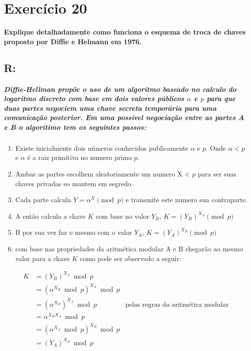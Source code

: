 \documentclass[10pt,a4paper]{report}
\begin{document}
\section*{Exercício 20}
\paragraph{Explique detalhadamente como funciona o esquema de troca de chaves proposto por Diffie e Helmann em 1976.}
\subsection*{R:}
\subparagraph{Diffie-Hellman propõe o uso de um algoritmo baseado no calculo do logaritmo discreto com base em dois valores públicos $\alpha$ e $p$ para que duas partes negociem uma chave secreta temporária para uma comunicação posterior. Em uma possível negociação entre as partes A e B o algorítimo tem os seguintes passos:}
\begin{enumerate}
\item Existe inicialmente dois números conhecidos publicamente $\alpha$ e $p$. Onde $\alpha < p$ e $\alpha$ é a raiz primitiva no numero primo $p$.
\item Ambas as partes escolhem aleatoriamente um numero X < $p$ para ser suas chaves privadas eo mantem em segredo.
\item Cada parte calcula $Y = \alpha^X \pmod p$ e transmite este numero sua contraparte.
\item A então calcula a chave $K$ com base no valor $Y_B$, $K=(Y_B)^{X_A} \pmod p $
\item B por sua vez faz o mesmo com o valor $Y_A$, $K = (Y_A)^{X_B} \pmod p$
\item com base nas propriedades da aritmética modular A e B chegarão ao mesmo valor para a chave $K$ como pode ser observado a seguir:
\end{enumerate}
\begin{align}
K & = (Y_B)^{X_A} \bmod p \\
& = (\alpha^{X_B} \bmod p)^{X_A} \bmod p \\
& = (\alpha^{X_B})^{X_A} \bmod p  & \textrm{pelas regras da aritmética modular} \\ 
& = \alpha^{X_BX_A} \bmod p \\
& = (\alpha^{X_A} \bmod p)^{X_B} \bmod p \\
& = (Y_A)^{X_B} \bmod p
\end{align}
\end{document}
